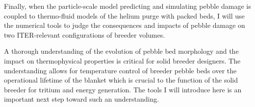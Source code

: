 Finally, when the particle-scale model predicting and simulating pebble damage is coupled to thermo-fluid models of the helium purge with packed beds, I will use the numerical tools to judge the consequences and impacts of pebble damage on two ITER-relevant configurations of breeder volumes.




A thorough understanding of the evolution of pebble bed morphology and the impact on thermophysical properties is critical for solid breeder designers. The understanding allows for temperature control of breeder pebble beds over the operational lifetime of the blanket which is crucial to the function of the solid breeder for tritium and energy generation. The tools I will introduce here is an important next step toward such an understanding. 


